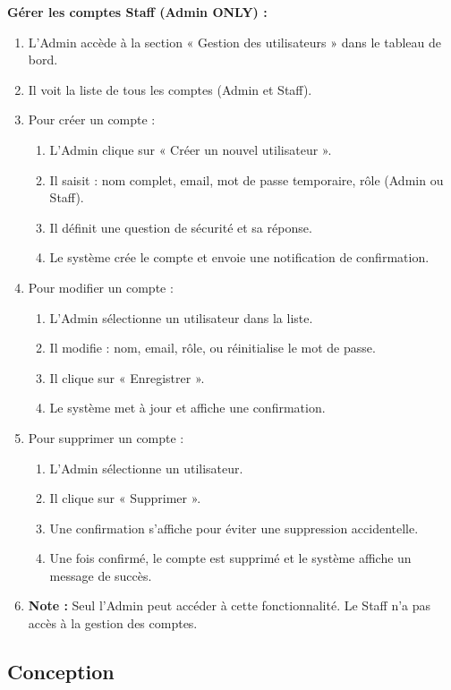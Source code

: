 \textbf{Gérer les comptes Staff (Admin ONLY) :}
\begin{enumerate}
\item L'Admin accède à la section « Gestion des utilisateurs » dans le tableau de bord.
\item Il voit la liste de tous les comptes (Admin et Staff).
\item Pour créer un compte :
  \begin{enumerate}
    \item L'Admin clique sur « Créer un nouvel utilisateur ».
    \item Il saisit : nom complet, email, mot de passe temporaire, rôle (Admin ou Staff).
    \item Il définit une question de sécurité et sa réponse.
    \item Le système crée le compte et envoie une notification de confirmation.
  \end{enumerate}
\item Pour modifier un compte :
  \begin{enumerate}
    \item L'Admin sélectionne un utilisateur dans la liste.
    \item Il modifie : nom, email, rôle, ou réinitialise le mot de passe.
    \item Il clique sur « Enregistrer ».
    \item Le système met à jour et affiche une confirmation.
  \end{enumerate}
\item Pour supprimer un compte :
  \begin{enumerate}
    \item L'Admin sélectionne un utilisateur.
    \item Il clique sur « Supprimer ».
    \item Une confirmation s'affiche pour éviter une suppression accidentelle.
    \item Une fois confirmé, le compte est supprimé et le système affiche un message de succès.
  \end{enumerate}
\item \textbf{Note :} Seul l'Admin peut accéder à cette fonctionnalité. Le Staff n'a pas accès à la gestion des comptes.
\end{enumerate}

\subsection{Conception}

